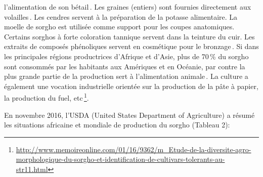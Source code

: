 \documentclass[a4paper,11pt]{article}
\begin{document}
l’alimentation de son bétail\,\cite{Chantereau_1991}. Les graines
(entiers) sont fournies directement aux
volailles\,\cite{SaintClair_1989}. Les cendres servent à la
préparation de la potasse alimentaire. La moelle de sorgho est
utilisée comme support pour les coupes anatomiques. Certains sorghos à
forte coloration tannique servent dans la teinture du cuir. Les
extraits de composés phénoliques servent en cosmétique pour le
bronzage\,\cite{BARRO_KONDOMBO_2010}. Si dans les principales régions
productrices d’Afrique et d’Asie, plus de 70\,\% du sorgho sont
consommés par les habitants aux Amériques et en Océanie, par contre la
plus grande partie de la production sert à l’alimentation
animale\,\cite{BARRO_KONDOMBO_2010}. La culture a également une
vocation industrielle orientée sur la production de la pâte à papier,
la production du fuel,
etc\,\footnote{\url{http://www.memoireonline.com/01/16/9362/m_Etude-de-la-diversite-agro-morphologique-du-sorgho-et-identification-de-cultivars-tolerants-au-str11.html}}.

En novembre 2016, l’USDA (United States Department of Agriculture) a résumé les situations africaine et mondiale de production du sorgho (Tableau 2):


\end{document}
